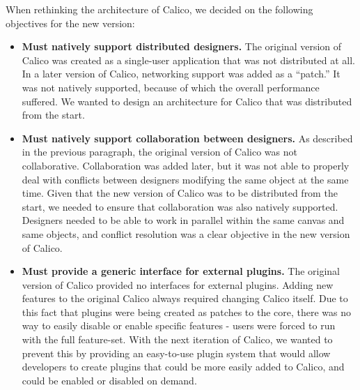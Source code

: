 When rethinking the architecture of Calico, we decided on the following objectives for the new version:
\begin{itemize}\itemsep1pt
\item 
\textbf{Must natively support distributed designers.}
\newline
The original version of Calico was created as a single-user application that was not distributed at all. In a later version of Calico, networking support was added as a ``patch.'' It was not natively supported, because of which the overall performance suffered.
We wanted to design an architecture for Calico that was distributed from the start.

\item
\textbf{Must natively support collaboration between designers.}
\newline
As described in the previous paragraph, the original version of Calico was not collaborative. 
Collaboration was added later, but it was not able to properly deal with conflicts between designers modifying the same object at the same time. 
Given that the new version of Calico was to be distributed from the start, we needed to ensure that collaboration was also natively supported.
Designers needed to be able to work in parallel within the same canvas and same objects, and conflict resolution was a clear objective in the new version of Calico. 

\item
\textbf{Must provide a generic interface for external plugins.}
\newline
The original version of Calico provided no interfaces for external plugins. 
Adding new features to the original Calico always required changing Calico itself.
Due to this fact that plugins were being created as patches to the core, there was no way to easily disable or enable specific features - users were forced to run with the full feature-set. 
With the next iteration of Calico, we wanted to prevent this by providing an easy-to-use plugin system that would allow developers to create plugins that could be more easily added to Calico, and could be enabled or disabled on demand.

\end{itemize}


